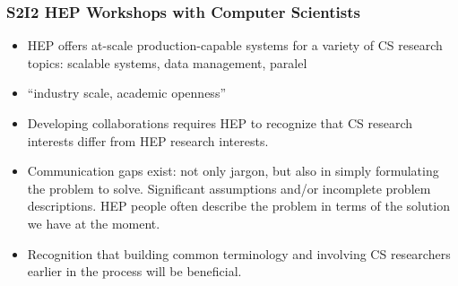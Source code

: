 \begin{frame}
\frametitle{S2I2 HEP Workshops with Computer Scientists}

\begin{itemize}
\item HEP offers at-scale production-capable systems for a variety of CS research topics: scalable systems, data management, paralel
\item ``industry scale, academic openness''
\item Developing collaborations requires HEP to recognize that CS research interests differ from HEP research interests.
\item Communication gaps exist: not only jargon, but also in simply formulating the problem to solve. Significant assumptions and/or incomplete problem descriptions. HEP people often describe the problem in terms of the solution we have at the moment.
\item Recognition that building common terminology and involving CS researchers earlier in the process will be beneficial.
\end{itemize}

\end{frame}


